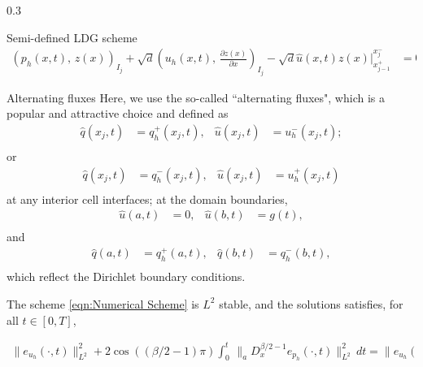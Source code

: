 \documentclass{msuposter}
\newcommand{\uh}{u_h}
\newcommand{\qh}{q_h}
\newcommand{\ph}{p_h}
\newcommand{\qhat}{\hat{q}}
\newcommand{\uhat}{\hat{u}}
\newcommand{\colwidth}{0.3\linewidth}
\begin{document}
\begin{frame}{}
\begin{columns}[t]
\begin{column}{\colwidth}
\begin{block}{Semi-defined LDG scheme}
\begin{equation*}
\begin{aligned}
\left(\ph(x,t),\,z(x)\right)_{I_j} +\sqrt{d}\left(\uh(x,t),\,\frac{\partial z(x)}{\partial x}\right)_{I_j} -\sqrt{d} \uhat(x,t)z(x)\Bigr\rvert_{x_{j-1}^+}^{x_j^-}&=0,
\end{aligned}
\end{equation*}
\end{block}
\begin{block}{Alternating fluxes}
Here, we use the so-called ``alternating fluxes", which is a popular and attractive choice and defined as
\begin{equation}\label{eqn:Numerical Flux1 inner}
\begin{aligned}
\qhat(x_j,t)&=\qh^+(x_j,t), & \uhat(x_j,t)&=\uh^-(x_j,t); \\
\end{aligned}
\end{equation}
or
\begin{equation}\label{eqn:Numerical Flux2 inner}
\begin{aligned}
\qhat(x_j,t)&=\qh^-(x_j,t), & \uhat(x_j,t)&=\uh^+(x_j,t) \\
\end{aligned}
\end{equation}
at any interior cell interfaces; 
at the domain boundaries, 
\begin{equation}\label{eqn:Numerical Flux \uh BC}
\begin{aligned}
\uhat(a,t)&=0, & \uhat(b,t)&=g(t),  \\
\end{aligned}
\end{equation}
and
\begin{equation}\label{eqn:Numerical Flux \qh BC}
\begin{aligned}
\qhat(a,t)&=\qh^+(a,t), & \qhat(b,t)&=\qh^-(b,t), \\
\end{aligned}
\end{equation}
which reflect the Dirichlet boundary conditions. 
\end{block}
\begin{theorem}[$L^2$ stability]
	The scheme \eqref{eqn:Numerical Scheme} is $L^2$ stable, and the solutions satisfies, for all $t\in [0,T]$, 
	
	\begin{equation}\label{eqn:Stability theorem}
	\begin{aligned}
	\|e_{\uh}(\cdot,t)\|_{L^2}^2 
	+  2\cos ((\beta/2-1)\pi)\int_{0}^{t} \, \|_{a}D_{x}^{\beta/2-1}e_{\ph}(\cdot,t)\|_{L^2}^2 \, dt
	= \|e_{\uh}(\cdot,0)\|_{L^2}^2. 
	\end{aligned}
	\end{equation}
\end{theorem}
\end{column}




\end{columns}
\end{frame}
\end{document}
